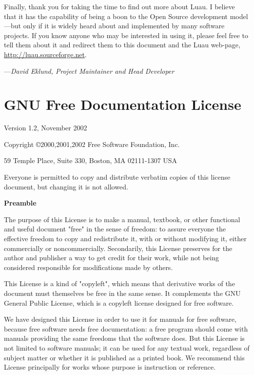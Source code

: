 \documentclass{report}
\begin{document}
Finally, thank you for taking the time to find out more about Luau.  I believe that it has the capability of being a boon to the Open Source development model---but only if it is widely heard about and implemented by many software projects.  If you know anyone who may be interested in using it, please feel free to tell them about it and redirect them to this document and the Luau web-page, \url{http://luau.sourceforge.net}.

---\emph{David Eklund, Project Maintainer and Head Developer}

\appendix

\chapter{GNU Free Documentation License}
\label{sec:appendixa}
 \begin{center}

       Version 1.2, November 2002


 Copyright \copyright 2000,2001,2002  Free Software Foundation, Inc.
 
 \bigskip
 
     59 Temple Place, Suite 330, Boston, MA  02111-1307  USA
  
 \bigskip
 
 Everyone is permitted to copy and distribute verbatim copies
 of this license document, but changing it is not allowed.
\end{center}


\begin{center}
{\bf\large Preamble}
\end{center}

The purpose of this License is to make a manual, textbook, or other
functional and useful document "free" in the sense of freedom: to
assure everyone the effective freedom to copy and redistribute it,
with or without modifying it, either commercially or noncommercially.
Secondarily, this License preserves for the author and publisher a way
to get credit for their work, while not being considered responsible
for modifications made by others.

This License is a kind of "copyleft", which means that derivative
works of the document must themselves be free in the same sense.  It
complements the GNU General Public License, which is a copyleft
license designed for free software.

We have designed this License in order to use it for manuals for free
software, because free software needs free documentation: a free
program should come with manuals providing the same freedoms that the
software does.  But this License is not limited to software manuals;
it can be used for any textual work, regardless of subject matter or
whether it is published as a printed book.  We recommend this License
principally for works whose purpose is instruction or reference.
\end{document}
